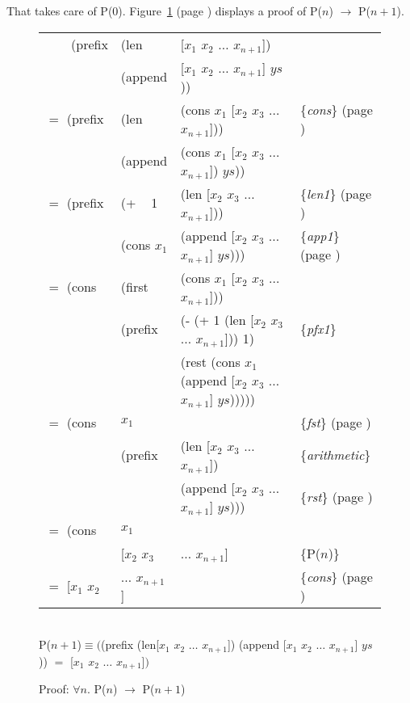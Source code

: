 That takes care of P(0). Figure~\ref{pfx-induc}
(page \pageref{pfx-induc}) displays a proof of P($n$) $\rightarrow$ P($n+1$).

\begin{figure}
\begin{center}
\addtolength{\tabcolsep}{-5pt}
\begin{tabular}{llll}
~~~~\textsf{(prefix} &\textsf{(len}    &\textsf{[$x_1$ $x_2$ $\dots$ $x_{n+1}$])}    &\\
            &\textsf{(append} &\textsf{[$x_1$ $x_2$ $\dots$ $x_{n+1}$] $ys$))}       &\\
$=$ \textsf{(prefix} &\textsf{(len}    &\textsf{(cons $x_1$ [$x_2$ $x_3$ $\dots$ $x_{n+1}$]))}&\{\emph{cons}\} (page \pageref{first-rest-cons})\\
            &\textsf{(append} &\textsf{(cons $x_1$ [$x_2$ $x_3$ $\dots$ $x_{n+1}$]) $ys$))}&\\
$=$	\textsf{(prefix} &\textsf{(+ ~ 1}  &\textsf{(len [$x_2$ $x_3$ $\dots$ $x_{n+1}$]))}       &\{\emph{len1}\} (page \pageref{len-equations})\\
            &\textsf{(cons $x_1$}  &\textsf{(append [$x_2$ $x_3$ $\dots$ $x_{n+1}$] $ys$)))}&\{\emph{app1}\} (page \pageref{append-equations})\\
$=$ \textsf{(cons}   &\textsf{(first}  &\textsf{(cons $x_1$ [$x_2$ $x_3$ $\dots$ $x_{n+1}$]))}&\\
            &\textsf{(prefix} &\textsf{(- (+ 1 (len [$x_2$ $x_3$ $\dots$ $x_{n+1}$])) 1)}&\{\emph{pfx1}\}\\
            &        &\textsf{(rest (cons $x_1$ (append [$x_2$ $x_3$ $\dots$ $x_{n+1}$] $ys$)))))}&\\
$=$ \textsf{(cons}   &$x_1$   &                                           &\{\emph{fst}\} (page \pageref{first-rest-cons})\\
            &\textsf{(prefix} &\textsf{(len [$x_2$ $x_3$ $\dots$ $x_{n+1}$])}        &\{\emph{arithmetic}\}\\
            &        &\textsf{(append [$x_2$ $x_3$ $\dots$ $x_{n+1}$] $ys$)))}& \{\emph{rst}\} (page \pageref{first-rest-cons})\\
$=$ \textsf{(cons}   &$x_1$   &                                          &\\
            &\textsf{[$x_2$ $x_3$} &$\dots$ $x_{n+1}$]                   &\{P($n$)\} \\
$=$ \textsf{[$x_1$ $x_2$} & \textsf{$\dots$ $x_{n+1}$]}                  &&\{\emph{cons}\} (page \pageref{first-rest-cons}) \\
\end{tabular}
\addtolength{\tabcolsep}{5pt}
~~\\
\vspace{2mm}
P($n+1$)$\equiv($\textsf{(prefix (len[$x_1$ $x_2$ $\dots$ $x_{n+1}$]) (append [$x_1$ $x_2$ $\dots$ $x_{n+1}$] $ys$))} $=$
 \textsf{[$x_1$ $x_2$ $\dots$ $x_{n+1}$]}$)$
\end{center}
\caption{Proof: $\forall n.$ P($n$) $\rightarrow$ P($n+1$)}
\label{pfx-induc}
\end{figure}

